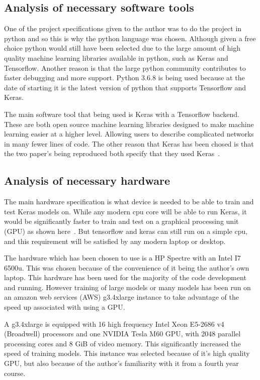 \documentclass[12pt,onecolumn,letterpaper]{article}
\begin{document}
\subsection{Analysis of necessary software tools}

One of the project specifications given to the author was to do the project in python and so this is why the python language was chosen. Although given a free choice python would still have been selected due to the large amount of high quality machine learning libraries available in python, such as Keras and Tensorflow. Another reason is that the large python community contributes to faster debugging and more support. Python 3.6.8 is being used because at the date of starting it is the latest version of python that supports Tensorflow and Keras. 

The main software tool that being used is Keras with a Tensorflow backend. These are both open source machine learning libraries designed to make machine learning easier at a higher level. Allowing users to describe complicated networks in many fewer lines of code. The other reason that Keras has been chosed is that the two paper's being reproduced both specify that they used Keras~\cite{oShea,Aoudia}. 

\subsection{Analysis of necessary hardware}
\label{sec:HardwareAnalysis}

The main hardware specification is what device is needed to be able to train and test Keras models on. While any modern cpu core will be able to run Keras, it would be significantly faster to train and test on a graphical processing unit (GPU) as shown here~\cite{TensorflowBenchmarking}. But tensorflow and keras can still run on a simple cpu, and this requirement will be satisfied by any modern laptop or desktop. 

The hardware which has been chosen to use is a HP Spectre with an Intel I7 6500u. This was chosen because of the convenience of it being the author's own laptop. This hardware has been used for the majority of the code development and running. However training of large models or many models has been run on an amazon web services (AWS) g3.4xlarge instance to take advantage of the speed up associated with using a GPU.

A g3.4xlarge is equipped with 16 high frequency Intel Xeon E5-2686 v4 (Broadwell) processors and one NVIDIA Tesla M60 GPU, with 2048 parallel processing cores and 8 GiB of video memory. This significantly increased the speed of training models. This instance was selected because of it's high quality GPU, but also because of the author's familiarity with it from a fourth year course.
\end{document}
